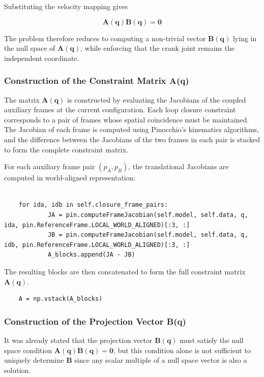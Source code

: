 Substituting the velocity mapping gives

\begin{equation*}
\textbf{A}(\textbf{q})\textbf{B}(\textbf{q}) = \textbf{0}
\end{equation*}

The problem therefore reduces to computing a non-trivial vector $\textbf{B}(\textbf{q})$ lying in the null space of $\textbf{A}(\textbf{q})$, while enforcing that the crank joint remains the independent coordinate.

\subsubsection*{Construction of the Constraint Matrix A(q)}
The matrix $\textbf{A}(\textbf{q})$ is constructed by evaluating the Jacobians of the coupled auxiliary frames at the current configuration. Each loop closure constraint corresponds to a pair of frames whose spatial coincidence must be maintained. The Jacobian of each frame is computed using Pinocchio's kinematics algorithms, and the difference between the Jacobians of the two frames in each pair is stacked to form the complete constraint matrix.

For each auxiliary frame pair $(\textit{p}_A, \textit{p}_B)$, the translational Jacobians are computed in world-aligned representation:

\begin{verbatim}

    for ida, idb in self.closure_frame_pairs:
            JA = pin.computeFrameJacobian(self.model, self.data, q, ida, pin.ReferenceFrame.LOCAL_WORLD_ALIGNED)[:3, :]
            JB = pin.computeFrameJacobian(self.model, self.data, q, idb, pin.ReferenceFrame.LOCAL_WORLD_ALIGNED)[:3, :]
            A_blocks.append(JA - JB)

\end{verbatim}

The resulting blocks are then concatenated to form the full constraint matrix $\textbf{A}(\textbf{q})$.

\begin{verbatim}
    A = np.vstack(A_blocks)
\end{verbatim}

\subsubsection*{Construction of the Projection Vector B(q)}
It was already stated that the projection vector $\textbf{B}(\textbf{q})$ must satisfy the null space condition $\textbf{A}(\textbf{q})\textbf{B}(\textbf{q}) = \textbf{0}$, but this condition alone is not sufficient to uniquely determine $\textbf{B}$ since any scalar multiple of a null space vector is also a solution. 

